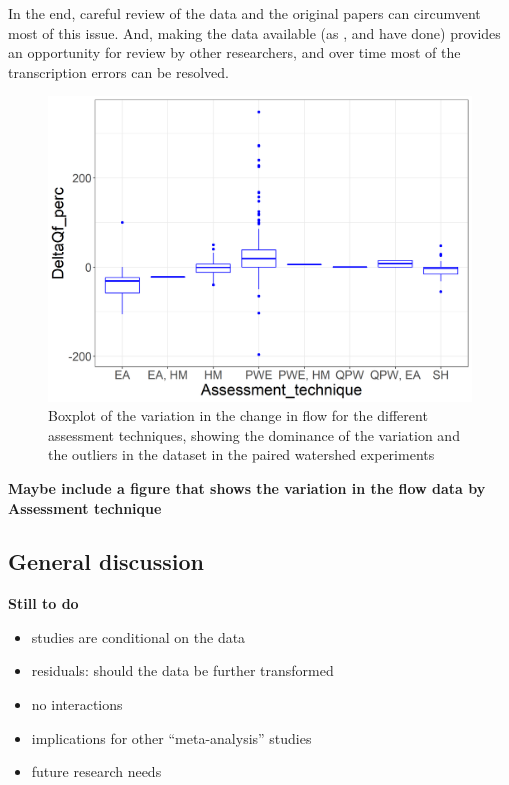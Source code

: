 \documentclass[]{elsarticle} %
\providecommand{\tightlist}{%
  \setlength{\itemsep}{0pt}\setlength{\parskip}{0pt}}
\begin{document}
In the end, careful review of the data and the original papers can circumvent most of this issue. And, making the data available (as \citet{zhang2017}, \citet{zhou2015} and \citet{filoso2017} have done) provides an opportunity for review by other researchers, and over time most of the transcription errors can be resolved.

\begin{figure}
\includegraphics[width=0.9\linewidth]{AssessmentTechnique_byDeltaQf} \caption{Boxplot of the variation in the change in flow for the different assessment techniques, showing the dominance of the variation and the outliers in the dataset in the paired watershed experiments}\label{fig:assessment}
\end{figure}

\textbf{Maybe include a figure that shows the variation in the flow data by Assessment technique}

\hypertarget{general-discussion}{%
\subsection{General discussion}\label{general-discussion}}

\textbf{Still to do}

\begin{itemize}
\tightlist
\item
  studies are conditional on the data
\item
  residuals: should the data be further transformed\\
\item
  no interactions\\
\item
  implications for other ``meta-analysis'' studies\\
\item
  future research needs
\end{itemize}
\end{document}
